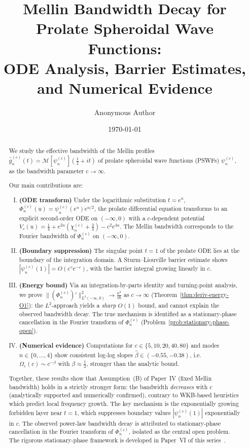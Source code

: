 \documentclass[12pt,a4paper]{amsart}
\title[Mellin Bandwidth Decay for PSWF Profiles]
{Mellin Bandwidth Decay for Prolate Spheroidal Wave Functions:\\
ODE Analysis, Barrier Estimates, and Numerical Evidence}
\author{Anonymous Author}
\date{\today}
\theoremstyle{remark}
\begin{document}
\maketitle

\begin{abstract}
We study the effective bandwidth of the Mellin profiles
$\widehat{g}_n^{(c)}(t) = \mathcal{M}[\psi_n^{(c)}](\tfrac{1}{2}+it)$
of prolate spheroidal wave functions (PSWFs) $\psi_n^{(c)}$,
as the bandwidth parameter $c \to \infty$.

Our main contributions are:
\begin{enumerate}[(I)]
\item \textbf{(ODE transform)} Under the logarithmic substitution
$t = e^u$, $\Phi_n^{(c)}(u) = \psi_n^{(c)}(e^u)e^{u/2}$,
the prolate differential equation transforms to an explicit
second-order ODE on $(-\infty, 0)$ with a $c$-dependent potential
$V_c(u) = \tfrac{1}{4} + e^{2u}(\chi_n^{(c)}+\tfrac{3}{4}) - c^2e^{4u}$.
The Mellin bandwidth corresponds to the Fourier bandwidth of $\Phi_n^{(c)}$ on $(-\infty,0)$.

\item \textbf{(Boundary suppression)} The singular point $t=1$ of
the prolate ODE lies at the boundary of the integration domain.
A Sturm--Liouville barrier estimate shows
$|\psi_n^{(c)}(1)| = O(c^\gamma e^{-c})$,
with the barrier integral growing linearly in $c$.

\item \textbf{(Energy bound)} Via an integration-by-parts identity
and turning-point analysis, we prove
$\|(\Phi_n^{(c)})'\|_{L^2(-\infty,0)}^2 \to \tfrac{n^2}{16}$
as $c\to\infty$ (Theorem~\ref{thm:deriv-energy-O1}): the $L^2$-approach yields a
\emph{sharp} $O(1)$ bound, and cannot explain the observed
bandwidth decay. The true mechanism is identified as a
stationary-phase cancellation in the Fourier transform of
$\Phi_n^{(c)}$ (Problem~\ref{prob:stationary-phase-open}).

\item \textbf{(Numerical evidence)} Computations for
$c \in \{5,10,20,40,80\}$ and modes $n \in \{0,\ldots,4\}$
show consistent log-log slopes $\hat\beta \in (-0.55, -0.38)$,
i.e.\ $\Omega_\varepsilon(c) \sim c^{-\beta}$ with
$\beta \approx \tfrac{1}{2}$, stronger than the analytic bound.
\end{enumerate}

Together, these results show that Assumption~(B) of Paper~IV
(fixed Mellin bandwidth) holds in a strictly stronger form:
the bandwidth \emph{decreases} with $c$ (analytically supported and numerically confirmed),
contrary to WKB-based heuristics which predict local frequency growth.
The key mechanism is the exponentially growing forbidden layer
near $t=1$, which suppresses boundary values $|\psi_n^{(c)}(1)|$
exponentially in $c$. The observed power-law bandwidth decay is
attributed to stationary-phase cancellation in the Fourier
transform of $\Phi_n^{(c)}$, isolated as the central open problem.
The rigorous stationary-phase framework is developed in
Paper~VI of this series~\cite{PaperVI}.
\end{abstract}
\end{document}
